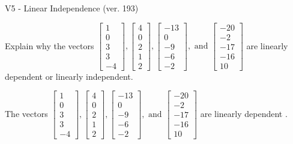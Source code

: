 \begin{exercise}
  \begin{exerciseTitle}V5 - Linear Independence (ver. 193)\end{exerciseTitle}
  \begin{exerciseStatement}
    Explain why the vectors \(\left[\begin{array}{r}
1 \\
0 \\
3 \\
3 \\
-4
\end{array}\right] , \left[\begin{array}{r}
4 \\
0 \\
2 \\
1 \\
2
\end{array}\right] , \left[\begin{array}{r}
-13 \\
0 \\
-9 \\
-6 \\
-2
\end{array}\right] , \text{ and } \left[\begin{array}{r}
-20 \\
-2 \\
-17 \\
-16 \\
10
\end{array}\right]\) are linearly dependent or linearly independent.	


  \end{exerciseStatement}
  \begin{exerciseAnswer}
   The vectors \(\left[\begin{array}{r}
1 \\
0 \\
3 \\
3 \\
-4
\end{array}\right] , \left[\begin{array}{r}
4 \\
0 \\
2 \\
1 \\
2
\end{array}\right] , \left[\begin{array}{r}
-13 \\
0 \\
-9 \\
-6 \\
-2
\end{array}\right] , \text{ and } \left[\begin{array}{r}
-20 \\
-2 \\
-17 \\
-16 \\
10
\end{array}\right]\) are 
  	 linearly dependent  .
  


  \end{exerciseAnswer}
\end{exercise}